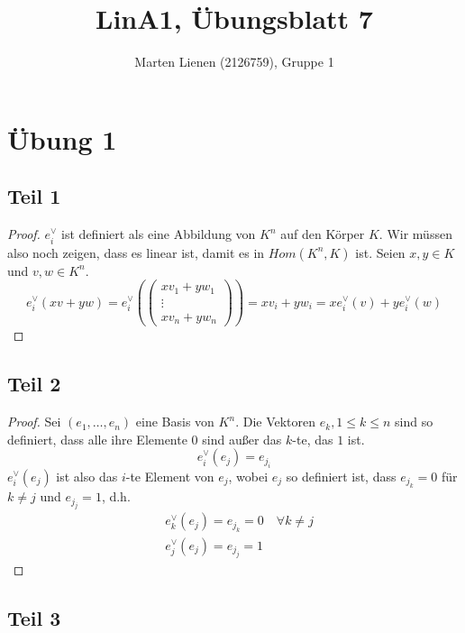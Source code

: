 \documentclass[a4paper,10pt]{article}
\title{LinA1, Übungsblatt 7}
\author{Marten Lienen (2126759), Gruppe 1}
\begin{document}
\maketitle

\section*{Übung 1}

\subsection*{Teil 1}

\begin{proof}
 $e_i^\vee$ ist definiert als eine Abbildung von $K^n$ auf den Körper $K$.
 Wir müssen also noch zeigen, dass es linear ist, damit es in $Hom(K^n, K)$ ist.
 Seien $x, y \in K$ und $v, w \in K^n$.
 \begin{equation}
  e_i^\vee(xv + yw) = e_i^\vee(\begin{pmatrix}xv_1 + yw_1\\ \vdots \\ xv_n + yw_n\end{pmatrix}) = xv_i + yw_i = xe_i^\vee(v) + ye_i^\vee(w)
 \end{equation}
\end{proof}

\subsection*{Teil 2}

\begin{proof}
 Sei $(e_1, \dots, e_n)$ eine Basis von $K^n$.
 Die Vektoren $e_k, 1 \le k \le n$ sind so definiert, dass alle ihre Elemente $0$ sind außer das $k$-te, das $1$ ist.
 \begin{equation}
  e_i^\vee(e_j) = e_{j_i}
 \end{equation}
 $e_i^\vee(e_j)$ ist also das $i$-te Element von $e_j$, wobei $e_j$ so definiert ist, dass $e_{j_k} = 0$ für $k \ne j$ und $e_{j_j} = 1$, d.h.
 \begin{align}
  & e_k^\vee(e_j) = e_{j_k} = 0 \quad\forall k \ne j\\
  & e_j^\vee(e_j) = e_{j_j} = 1
 \end{align}
\end{proof}

\subsection*{Teil 3}
\end{document}
